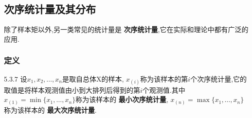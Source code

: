 \begin{example}
\end{example}
\subsection{次序统计量及其分布}
除了样本矩以外,另一类常见的统计量是 \textbf{次序统计量},它在实际和理论中都有广泛的应用.
\subsubsection{定义}
\begin{definition}{}{5.3.7}
设$x_1,x_2,\dotsc,x_n$是取自总体X的样本, $x_{(i)}$称为该样本的第$i$个次序统计量,它的取值是将样本观测值由小到大排列后得到的第$i$个观测值.其中$x_{(1)}=\min\{x_1,\dotsc,x_n\}$称为该样本的 \textbf{最小次序统计量}, $x_{(n)}=\max\{x_1,\dotsc,x_n\}$称为该样本的 \textbf{最大次序统计量}.
\end{definition}

